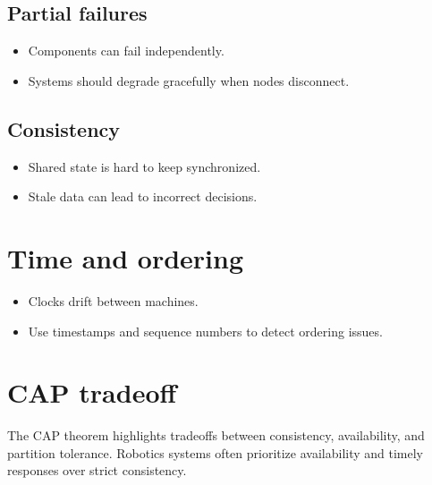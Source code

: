 \documentclass[letterpaper,10pt,english]{sphinxmanual}
\begin{document}
\subsection{Partial failures}
\label{\detokenize{appendix_e_distributed_systems:partial-failures}}\begin{itemize}
\item {} 
\sphinxAtStartPar
Components can fail independently.

\item {} 
\sphinxAtStartPar
Systems should degrade gracefully when nodes disconnect.

\end{itemize}


\subsection{Consistency}
\label{\detokenize{appendix_e_distributed_systems:consistency}}\begin{itemize}
\item {} 
\sphinxAtStartPar
Shared state is hard to keep synchronized.

\item {} 
\sphinxAtStartPar
Stale data can lead to incorrect decisions.

\end{itemize}


\section{Time and ordering}
\label{\detokenize{appendix_e_distributed_systems:time-and-ordering}}\begin{itemize}
\item {} 
\sphinxAtStartPar
Clocks drift between machines.

\item {} 
\sphinxAtStartPar
Use timestamps and sequence numbers to detect ordering issues.

\end{itemize}


\section{CAP tradeoff}
\label{\detokenize{appendix_e_distributed_systems:cap-tradeoff}}
\sphinxAtStartPar
The CAP theorem highlights tradeoffs between consistency, availability, and
partition tolerance. Robotics systems often prioritize availability and timely
responses over strict consistency.
\end{document}
